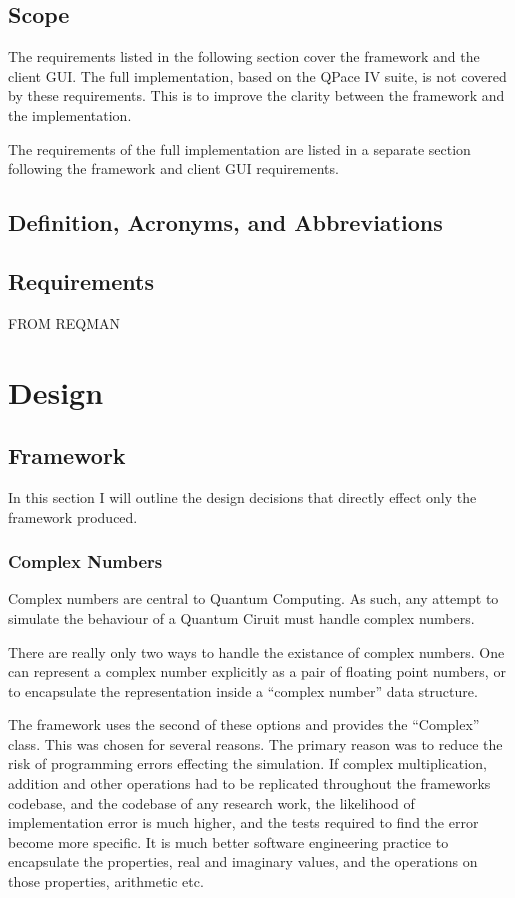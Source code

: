 \documentclass[authoryearcitations]{UoYCSproject}
\begin{document}
\section{Scope}
The requirements listed in the following section cover the framework and the client GUI.
The full implementation, based on the QPace IV suite, is not covered by these requirements.
This is to improve the clarity between the framework and the implementation.

The requirements of the full implementation are listed in a separate section following the framework and client GUI requirements.

\section{Definition, Acronyms, and Abbreviations}

\section{Requirements}
FROM REQMAN

\chapter{Design }

\section{Framework}
In this section I will outline the design decisions that directly effect only the framework produced.

\subsection{Complex Numbers}
Complex numbers are central to Quantum Computing.
As such, any attempt to simulate the behaviour of a Quantum Ciruit must handle complex numbers.

There are really only two ways to handle the existance of complex numbers.
One can represent a complex number explicitly as a pair of floating point numbers, or to encapsulate the representation inside a ``complex number'' data structure.

The framework uses the second of these options and provides the ``Complex'' class.
This was chosen for several reasons.
The primary reason was to reduce the risk of programming errors effecting the simulation.
If complex multiplication, addition and other operations had to be replicated throughout the frameworks codebase, and the codebase of any research work, the likelihood of implementation error is much higher, and the tests required to find the error become more specific.
It is much better software engineering practice to encapsulate the properties, real and imaginary values, and the operations on those properties, arithmetic etc.
\end{document}
